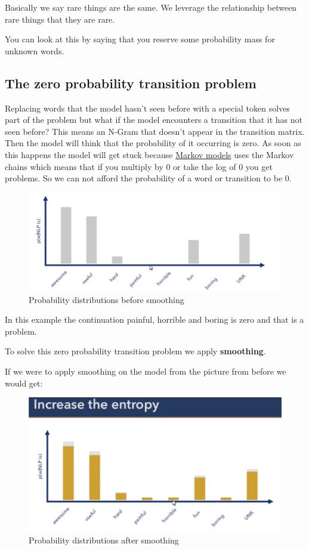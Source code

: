 \documentclass[
  11pt,
  british,
]{article}
\begin{document}
Basically we say rare things are the same. We leverage the relationship
between rare things that they are rare.

You can look at this by saying that you reserve some probability mass
for unknown words.

\hypertarget{the-zero-probability-transition-problem}{%
\subsection{The zero probability transition
problem}\label{the-zero-probability-transition-problem}}

Replacing words that the model hasn't seen before with a special token
solves part of the problem but what if the model encounters a transition
that it has not seen before? This means an N-Gram that doesn't appear in
the transition matrix. Then the model will think that the probability of
it occurring is zero. As soon as this happens the model will get stuck
because \href{Markov\%20models.md}{Markov models} uses the Markov chains
which means that if you multiply by 0 or take the log of 0 you get
problems. So we can not afford the probability of a word or transition
to be 0.

\begin{figure}
\centering
\includegraphics{Pasted_image_20220224152619.png}
\caption{Probability distributions before smoothing}
\end{figure}

In this example the continuation painful, horrible and boring is zero
and that is a problem.

To solve this zero probability transition problem we apply
\textbf{smoothing}.

If we were to apply smoothing on the model from the picture from before
we would get:

\begin{figure}
\centering
\includegraphics{Pasted_image_20220224152946.png}
\caption{Probability distributions after smoothing}
\end{figure}
\end{document}
